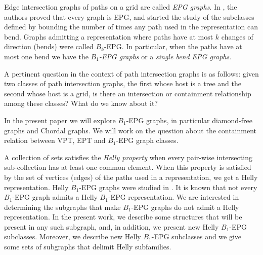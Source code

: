 \documentclass[9pt]{entcs}
\begin{document}
Edge intersection graphs of paths on a grid are called \textit{EPG graphs}. 
In \cite{golumbic2009}, the authors proved that every graph is EPG, and started the study of the subclasses
defined by bounding the number of times any path used in the representation can bend.  Graphs admitting a representation
where  paths  have at most $k$ changes of direction  (bends) were called $B_k$-EPG. 
 In particular, when the paths have at most one bend we have the \textit{ $B_1$-EPG graphs} or a \textit{single bend EPG graphs}.
 

 

 
 A pertinent question in the context of path intersection graphs is as follows: given two classes of path intersection graphs,
 the first whose host is a tree and the second whose host is a grid,  is there an intersection or containment relationship among these classes? What do we know about it?




In the present paper we will explore $B_1$-EPG graphs, in particular diamond-free graphs and Chordal graphs. We will work on the question about the containment
relation between  VPT, EPT and $B_1$-EPG graph classes.


 A collection  of sets satisfies the \textit{Helly property} when every pair-wise intersecting sub-collection  has at least one common element. When this property
 is satisfied by the set of vertices (edges) of the paths used in a representation, we get a Helly representation.  Helly $B_1$-EPG graphs were studied
 in \cite{bornstein2019complexity}.                                     
It is known that not every $B_1$-EPG graph admits a Helly $B_1$-EPG representation. We are interested in determining the subgraphs that make
$B_1$-EPG graphs do not admit a Helly representation. In the present work, we describe some structures that will be present in any such subgraph,
and, in addition, we present new  Helly $B_1$-EPG  subclasses.
Moreover,  we  describe new  Helly $B_1$-EPG  subclasses %
and we give some sets of subgraphs that delimit Helly subfamilies.   
\end{document}
